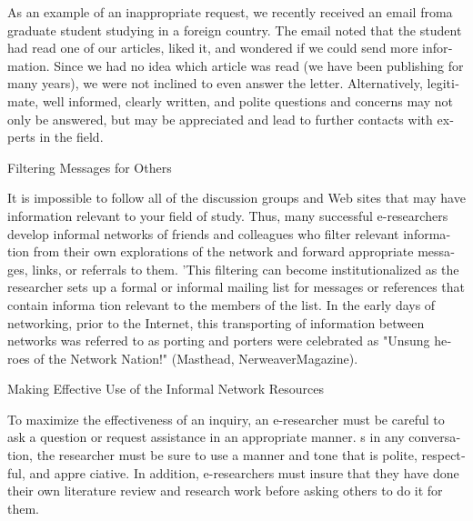 \documentclass[a4paper,12pt]{article}
\begin{document}
\begin{latin}
As an example of an inappropriate request, we recently received an email  froma
\noindent
graduate student studying in  a foreign country. The email noted that the student had read one of our articles, liked it,  and  wondered if we  could send more  information. Since we had no idea which article was  read (we have been  publishing for many years), we  were   not  inclined to  even   answer the  letter.  Alternatively,  legitimate,  well­ informed, clearly written, and polite questions and concerns may  not only be answered, but may be appreciated and lead to further contacts with experts in the field.

\vspace{0.1cm}
\vspace{0.1cm}
\vspace{0.1cm}
   

           

Filtering Messages for Others
\noindent

\vspace{0.1cm}
\vspace{0.1cm}
\vspace{0.1cm}
\noindent
It  is  impossible to follow all  of the discussion groups and  Web  sites that may have information relevant to your field of study. Thus,  many successful  e-researchers develop informal networks of friends and colleagues who filter relevant information from   their own explorations of the network and forward appropriate messages, links, or referrals to them. 'This filtering can become institutionalized as the  researcher sets up a formal or informal mailing list for messages or references that contain informa­ tion relevant to the members  of the list.  In the early days of networking, prior to the Internet, this transporting of information  between networks was  referred to as porting and porters were celebrated as  "Unsung heroes of the  Network Nation!" (Masthead, NerweaverMagazine).

\vspace{0.1cm}
\vspace{0.1cm}
\vspace{0.1cm}





Making Effective  Use of the Informal Network Resources


\noindent
To maximize the  effectiveness of an  inquiry, an  e-researcher must be careful to ask  a question or request assistance in  an  appropriate manner. s in any conversation, the
researcher must  be sure to use a manner and  tone that  is polite, respectful, and appre­ ciative.  In addition, e-researchers must insure that they  have done their own  literature review  and research work before asking others to do it  for  them.



\end{latin}
\end{document}
